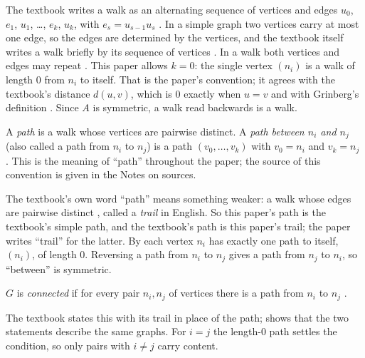 The textbook writes a walk as an alternating sequence of vertices and edges $u_0$, $e_1$, $u_1$, \dots, $e_k$, $u_k$, with $e_s = u_{s-1}u_s$ \cite[Definition 1.2.10, p.~21]{petrosyan_graph_theory}. In a simple graph two vertices carry at most one edge, so the edges are determined by the vertices, and the textbook itself writes a walk briefly by its sequence of vertices \cite[p.~21, the sentence after Definition 1.2.10]{petrosyan_graph_theory}. In a walk both vertices and edges may repeat \cite[p.~22]{petrosyan_graph_theory}. This paper allows $k = 0$: the single vertex $(n_i)$ is a walk of length $0$ from $n_i$ to itself. That is the paper's convention; it agrees with the textbook's distance $d(u,v)$, which is $0$ exactly when $u = v$ \cite[p.~23]{petrosyan_graph_theory} and with Grinberg's definition \cite[Example 2.9.2, p.~37]{grinberg_graph_theory}. Since $A$ is symmetric, a walk read backwards is a walk.

\begin{definition}\label{def:path}
A \emph{path} is a walk whose vertices are pairwise distinct. A \emph{path between $n_i$ and $n_j$} (also called a path from $n_i$ to $n_j$) is a path $(v_0, \dots, v_k)$ with $v_0 = n_i$ and $v_k = n_j$ \cite[Definition 1.2.13, p.~22]{petrosyan_graph_theory} \cite[Definition 2.9.1(c),(d)]{grinberg_graph_theory} \cite{bai_bimsa_adjacency}. This is the meaning of ``path'' throughout the paper; the source of this convention is given in the Notes on sources.
\end{definition}

\begin{remark}\label{rem:trap}
The textbook's own word ``path'' means something weaker: a walk whose edges are pairwise distinct \cite[Definition 1.2.12, p.~22]{petrosyan_graph_theory}, called a \emph{trail} in English. So this paper's path is the textbook's simple path, and the textbook's path is this paper's trail; the paper writes ``trail'' for the latter. By  each vertex $n_i$ has exactly one path to itself, $(n_i)$, of length $0$. Reversing a path from $n_i$ to $n_j$ gives a path from $n_j$ to $n_i$, so ``between'' is symmetric.
\end{remark}

\begin{definition}\label{def:connected}
$G$ is \emph{connected} if for every pair $n_i, n_j$ of vertices there is a path from $n_i$ to $n_j$ \cite[Definition 2.1.1, p.~48]{petrosyan_graph_theory}.
\end{definition}

The textbook states this with its trail in place of the path;  shows that the two statements describe the same graphs. For $i = j$ the length-$0$ path settles the condition, so only pairs with $i \ne j$ carry content.
